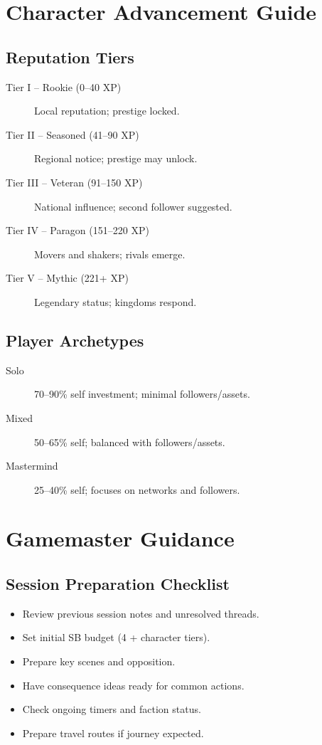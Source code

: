\newpage
\section{Character Advancement Guide}\label{sec:advancement_reference}

\subsection{Reputation Tiers}\label{subsec:reputation_tiers_ref}
\begin{description}
    \item[Tier I -- Rookie (0--40 XP)] Local reputation; prestige locked.
    \item[Tier II -- Seasoned (41--90 XP)] Regional notice; prestige may unlock.
    \item[Tier III -- Veteran (91--150 XP)] National influence; second follower suggested.
    \item[Tier IV -- Paragon (151--220 XP)] Movers and shakers; rivals emerge.
    \item[Tier V -- Mythic (221+ XP)] Legendary status; kingdoms respond.
\end{description}

\subsection{Player Archetypes}\label{subsec:archetypes_ref}
\begin{description}
    \item[Solo] 70--90\% self investment; minimal followers/assets.
    \item[Mixed] 50--65\% self; balanced with followers/assets.
    \item[Mastermind] 25--40\% self; focuses on networks and followers.
\end{description}

\newpage
\section{Gamemaster Guidance}\label{sec:gm_reference}

\subsection{Session Preparation Checklist}\label{subsec:session_prep_ref}
\begin{itemize}
    \item Review previous session notes and unresolved threads.
    \item Set initial SB budget (4 + character tiers).
    \item Prepare key scenes and opposition.
    \item Have consequence ideas ready for common actions.
    \item Check ongoing timers and faction status.
    \item Prepare travel routes if journey expected.
\end{itemize}

